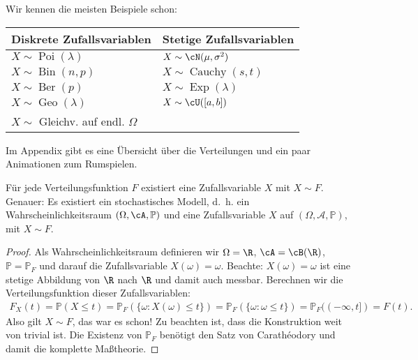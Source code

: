 \begin{beispiel}
	Wir kennen die meisten Beispiele schon:
	\begin{center}
	\begin{tabular}{l|l}
		Diskrete Zufallsvariablen& Stetige Zufallsvariablen\\ %
		\hline
		$X \sim \operatorname{Poi}(\lambda)$& $X \sim \cN(\mu, \sigma^2)$\\
		$X \sim \operatorname{Bin}(n,p)$& $X \sim \operatorname{Cauchy}(s,t)$\\ 
		$X \sim \operatorname{Ber}(p)$& $X \sim \operatorname{Exp}(\lambda)$\\
		$X \sim \operatorname{Geo}(\lambda)$& $X \sim \cU([a,b])$\\
		$X \sim$ Gleichv. auf endl. $\Omega$ &\\
	\end{tabular}
	\end{center}
	Im Appendix gibt es eine \"Ubersicht \"uber die Verteilungen und ein paar Animationen zum Rumspielen.
\end{beispiel}


\begin{satz}\label{existenz}
	Für jede Verteilungsfunktion $F$ existiert eine Zufallsvariable $X$ mit $X\sim F$. Genauer: Es existiert ein stochastisches Modell, \mbox{d. h.} ein Wahrscheinlichkeitsraum $(\Omega, \cA, \mathbb{P})$ und eine Zufallsvariable $X$ auf $(\Omega, \mathcal A, \mathbb P)$, mit $X \sim F$.
\end{satz}

\begin{proof}
	Als Wahrscheinlichkeitsraum definieren wir $\Omega=\R$, $\cA = \cB(\R)$, $\mathbb{P} = \mathbb{P}_F$ und darauf die Zufallsvariable $X(\omega) = \omega$. Beachte: $X(\omega)=\omega$ ist eine stetige Abbildung von $\R$ nach $\R$ und damit auch messbar. Berechnen wir die Verteilungsfunktion dieser Zufallsvariablen:
		\begin{align*}
		F_X(t)=\mathbb P(X\leq t)=\mathbb P_F(\{\omega: X(\omega)\leq t\})=\mathbb P_F(\{\omega: \omega\leq t\})=\mathbb P_F((-\infty,t])=F(t).
	\end{align*}
%	
	Also gilt $X\sim F$, das war es schon! Zu beachten ist, dass die Konstruktion weit von trivial ist. Die Existenz von $\mathbb P_F$ ben\"otigt den Satz von Carath\'eodory und damit die komplette Ma\ss theorie. 
\end{proof}

